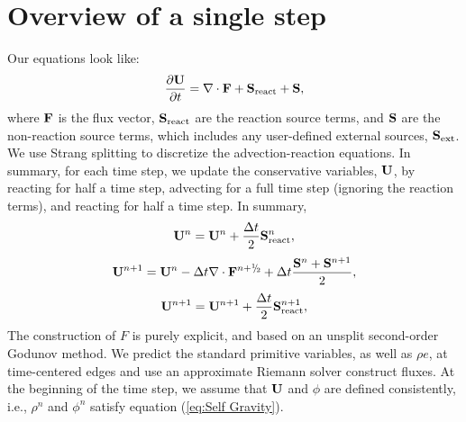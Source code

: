 \section{Overview of a single step}

Our equations look like:
\begin{equation}
\frac{\partial{\bf U}}{\partial t} = \nabla\cdot{\bf F} + {\bf S}_{\rm react} + {\bf S},
\end{equation}
where ${\bf F}$ is the flux vector, ${\bf S}_{\rm react}$ are the reaction
source terms, and ${\bf S}$ are the non-reaction source terms, which
includes any user-defined external sources, ${\bf S}_{\rm ext}$.  We use
Strang splitting to discretize the advection-reaction equations.  In
summary, for each time step, we update the conservative variables,
${\bf U}$, by reacting for half a time step, advecting for a full time
step (ignoring the reaction terms), and reacting for half a time step.
In summary,
\begin{equation}
{\bf U}^n = {\bf U}^n + \frac{\Delta t}{2}{\bf S}_{\rm react}^n,
\end{equation}
\begin{equation}
\Ub^{n+1} = \Ub^n - \Delta t \nabla \cdot\Fb^\nph + \dt\frac{\Sb^n + \Sb^{n+1}}{2},
\end{equation}
\begin{equation}
{\bf U}^{n+1} = {\bf U}^{n+1} + \frac{\Delta t}{2}{\bf S}_{\rm react}^{n+1},
\end{equation}
The construction of $F$ is purely explicit, and based on an unsplit
second-order Godunov method.  We predict the standard primitive
variables, as well as $\rho e$, at time-centered edges and use an
approximate Riemann solver construct fluxes.  At the beginning of the
time step, we assume that ${\bf U}$ and $\phi$ are defined consistently,
i.e., $\rho^n$ and $\phi^n$ satisfy equation (\ref{eq:Self
  Gravity}).\\

